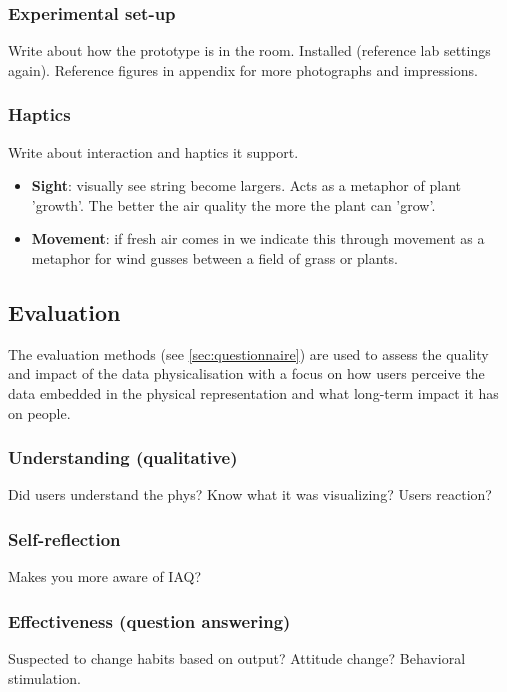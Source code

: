 \subsubsection{Experimental set-up}

Write about how the prototype is in the room. Installed (reference lab settings again). Reference figures in appendix for more photographs and impressions.

\subsubsection{Haptics}

Write about interaction and haptics it support.

\begin{itemize}
  \item \textbf{Sight}: visually see string become largers. Acts as a metaphor of plant 'growth'. The better the air quality the more the plant can 'grow'.
  \item \textbf{Movement}: if fresh air comes in we indicate this through movement as a metaphor for wind gusses between a field of grass or plants.
\end{itemize}

\subsection{Evaluation}

The evaluation methods (see \ref{sec:questionnaire}) are used to assess the quality and impact of the data physicalisation with a focus on how users perceive the data embedded in the physical representation and what long-term impact it has on people.


\subsubsection{Understanding (qualitative)}

Did users understand the phys? Know what it was visualizing? Users reaction?

\subsubsection{Self-reflection}

Makes you more aware of IAQ?

\subsubsection{Effectiveness (question answering)}

Suspected to change habits based on output? Attitude change? Behavioral stimulation.



